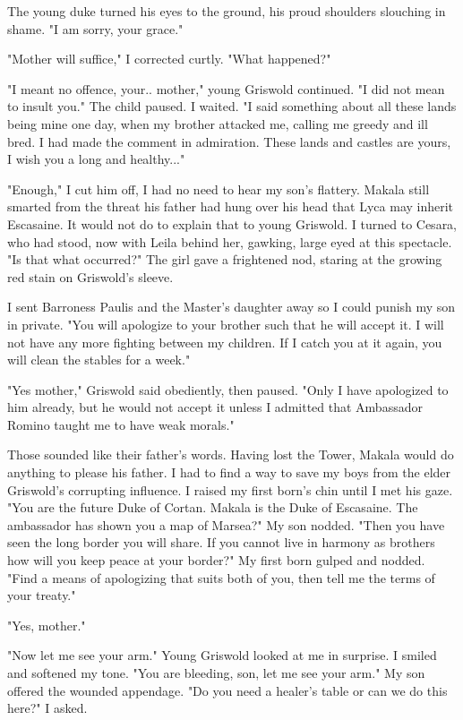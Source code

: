 \documentclass{article}
\begin{document}
The young duke turned his eyes to the ground, his proud shoulders slouching in shame. "I am sorry, your grace."

"Mother will suffice," I corrected curtly. "What happened?"

"I meant no offence, your.. mother," young Griswold continued. "I did not mean to insult you." The child paused. I waited. "I said something about all these lands being mine one day, when my brother attacked me, calling me greedy and ill bred. I had made the comment in admiration. These lands and castles are yours, I wish you a long and healthy..."

"Enough," I cut him off, I had no need to hear my son's flattery. Makala still smarted from the threat his father had hung over his head that Lyca may inherit Escasaine. It would not do to explain that to young Griswold. I turned to Cesara, who had stood, now with Leila behind her, gawking, large eyed at this spectacle. "Is that what occurred?" The girl gave a frightened nod, staring at the growing red stain on Griswold's sleeve.

I sent Barroness Paulis and the Master's daughter away so I could punish my son in private. "You will apologize to your brother such that he will accept it. I will not have any more fighting between my children. If I catch you at it again, you will clean the stables for a week."

"Yes mother," Griswold said obediently, then paused. "Only I have apologized to him already, but he would not accept it unless I admitted that Ambassador Romino taught me to have weak morals."

Those sounded like their father's words. Having lost the Tower, Makala would do anything to please his father. I had to find a way to save my boys from the elder Griswold's corrupting influence. I raised my first born's chin until I met his gaze. "You are the future Duke of Cortan. Makala is the Duke of Escasaine. The ambassador has shown you a map of Marsea?" My son nodded. "Then you have seen the long border you will share. If you cannot live in harmony as brothers how will you keep peace at your border?" My first born gulped and nodded. "Find a means of apologizing that suits both of you, then tell me the terms of your treaty."

"Yes, mother." 

"Now let me see your arm." Young Griswold looked at me in surprise. I smiled and softened my tone. "You are bleeding, son, let me see your arm." My son offered the wounded appendage. "Do you need a healer's table or can we do this here?" I asked.
\end{document}
